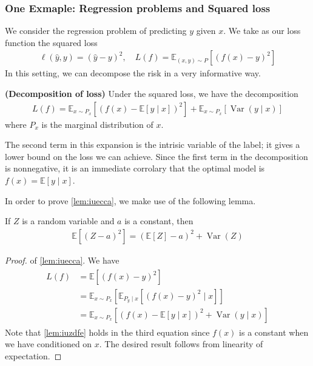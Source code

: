 \documentclass{article}
\newcommand{\bfs}[1]{\textbf{({#1}) }}
\begin{document}
\subsubsection{One Exmaple: Regression problems and Squared loss}
We consider the regression problem of predicting $y$ given $x$. We take as our loss function the squared loss
\begin{align*}
\ell(\hat{y}, y)=(\hat{y}-y)^{2}, \quad L(f)=\mathbb{E}_{(x, y) \sim P}\left[(f(x)-y)^{2}\right]
\end{align*}
In this setting, we can decompose the risk in a very informative way.
\begin{lema}\bfs{Decomposition of loss}\label{lem:iuecca}
 Under the squared loss, we have the decomposition
\begin{align*}
L(f)=\mathbb{E}_{x \sim P_{x}}\left[(f(x)-\mathbb{E}[y \mid x])^{2}\right]+\mathbb{E}_{x \sim P_{x}}[\operatorname{Var}(y \mid x)]
\end{align*}
where $P_{x}$ is the marginal distribution of $x$.
\end{lema}
\begin{rema}
The second term in this expansion is the intrisic variable of the label; it gives a lower bound on the loss we can achieve. Since the first term in the decomposition is nonnegative, it is an immediate corrolary that the optimal model is $f(x)=\mathbb{E}[y \mid x]$.
\end{rema}
In order to prove \cref{lem:iuecca}, we make use of the following lemma.
\begin{lema}\label{lem:iuzdfe}
  If $Z$ is a random variable and $a$ is a constant, then
\begin{align*}
\mathbb{E}\left[(Z-a)^{2}\right]=(\mathbb{E}[Z]-a)^{2}+\operatorname{Var}(Z)
\end{align*}
\end{lema}
\begin{proof} of \cref{lem:iuecca}. 
 We have
\begin{align*}
\begin{aligned}
L(f) &=\mathbb{E}\left[(f(x)-y)^{2}\right] \\
&=\mathbb{E}_{x \sim P_{x}}\left[\mathbb{E}_{P_{y} \mid x}\left[(f(x)-y)^{2} \mid x\right]\right] \\
&=\mathbb{E}_{x \sim P_{x}}\left[(f(x)-\mathbb{E}[y \mid x])^{2}+\operatorname{Var}(y \mid x)\right]
\end{aligned}
\end{align*}
Note that \cref{lem:iuzdfe} holds in the third equation since $f(x)$ is a constant when we have conditioned on $x$. The desired result follows from linearity of expectation.
\end{proof}
\end{document}
